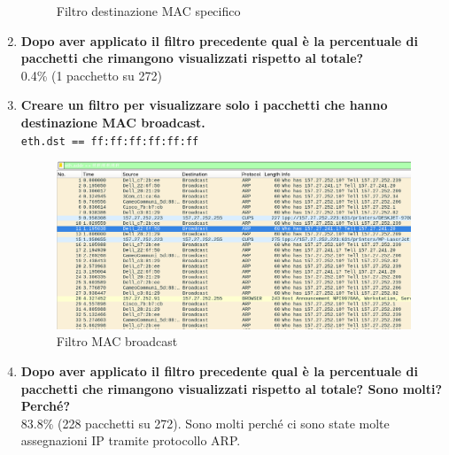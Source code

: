\documentclass[a4paper,12pt]{article}
\begin{document}
\begin{enumerate}
\begin{figure}[h]
      \caption{Filtro destinazione MAC specifico}
    \end{figure}
  \item \textbf{Dopo aver applicato il filtro precedente qual è la percentuale di pacchetti che rimangono visualizzati rispetto al totale?}\\
    0.4\% (1 pacchetto su 272)
  \item \textbf{Creare un filtro per visualizzare solo i pacchetti che hanno destinazione MAC broadcast.}\\
    \texttt{eth.dst == ff:ff:ff:ff:ff:ff}
    \begin{figure}[h]
      \centering
      \includegraphics[width=0.6\linewidth]{src/filtroMAC_broadcast.png}
      \caption{Filtro MAC broadcast}
    \end{figure}
  \item \textbf{Dopo aver applicato il filtro precedente qual è la percentuale di pacchetti che rimangono visualizzati rispetto al totale? Sono molti? Perché?}\\
    83.8\% (228 pacchetti su 272). Sono molti perché ci sono state molte assegnazioni IP tramite protocollo ARP.
\end{enumerate}

\end{document}
